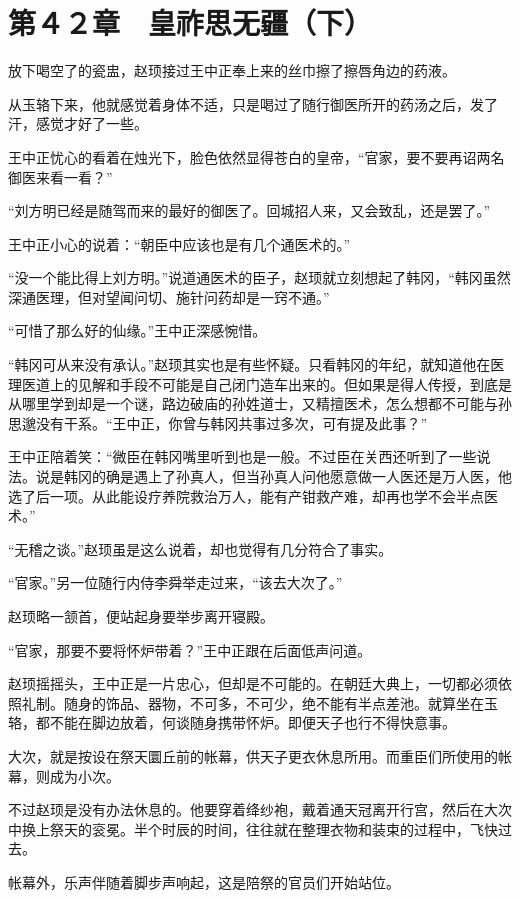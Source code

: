 \section{第４２章　皇祚思无疆（下）}

放下喝空了的瓷盅，赵顼接过王中正奉上来的丝巾擦了擦唇角边的药液。

从玉辂下来，他就感觉着身体不适，只是喝过了随行御医所开的药汤之后，发了汗，感觉才好了一些。

王中正忧心的看着在烛光下，脸色依然显得苍白的皇帝，“官家，要不要再诏两名御医来看一看？”

“刘方明已经是随驾而来的最好的御医了。回城招人来，又会致乱，还是罢了。”

王中正小心的说着：“朝臣中应该也是有几个通医术的。”

“没一个能比得上刘方明。”说道通医术的臣子，赵顼就立刻想起了韩冈，“韩冈虽然深通医理，但对望闻问切、施针问药却是一窍不通。”

“可惜了那么好的仙缘。”王中正深感惋惜。

“韩冈可从来没有承认。”赵顼其实也是有些怀疑。只看韩冈的年纪，就知道他在医理医道上的见解和手段不可能是自己闭门造车出来的。但如果是得人传授，到底是从哪里学到却是一个谜，路边破庙的孙姓道士，又精擅医术，怎么想都不可能与孙思邈没有干系。“王中正，你曾与韩冈共事过多次，可有提及此事？”

王中正陪着笑：“微臣在韩冈嘴里听到也是一般。不过臣在关西还听到了一些说法。说是韩冈的确是遇上了孙真人，但当孙真人问他愿意做一人医还是万人医，他选了后一项。从此能设疗养院救治万人，能有产钳救产难，却再也学不会半点医术。”

“无稽之谈。”赵顼虽是这么说着，却也觉得有几分符合了事实。

“官家。”另一位随行内侍李舜举走过来，“该去大次了。”

赵顼略一颔首，便站起身要举步离开寝殿。

“官家，那要不要将怀炉带着？”王中正跟在后面低声问道。

赵顼摇摇头，王中正是一片忠心，但却是不可能的。在朝廷大典上，一切都必须依照礼制。随身的饰品、器物，不可多，不可少，绝不能有半点差池。就算坐在玉辂，都不能在脚边放着，何谈随身携带怀炉。即便天子也行不得快意事。

大次，就是按设在祭天圜丘前的帐幕，供天子更衣休息所用。而重臣们所使用的帐幕，则成为小次。

不过赵顼是没有办法休息的。他要穿着绛纱袍，戴着通天冠离开行宫，然后在大次中换上祭天的衮冕。半个时辰的时间，往往就在整理衣物和装束的过程中，飞快过去。

帐幕外，乐声伴随着脚步声响起，这是陪祭的官员们开始站位。

